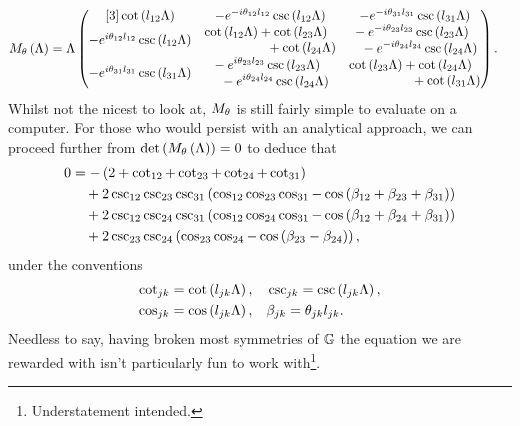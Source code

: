 \begin{align*}
	M_{\theta}\left( \Lambda \right) &= \Lambda
	\begin{pmatrix}[3]
		\cot\left( l_{12}\Lambda \right) & -
		e^{-i\theta_{12}l_{12}}\csc\left( l_{12}\Lambda \right) &
		-e^{-i\theta_{31}l_{31}}\csc\left( l_{31}\Lambda \right) \\
		-e^{i\theta_{12}l_{12}}\csc\left( l_{12}\Lambda \right) &
		\!\begin{aligned} \cot\left( l_{12}\Lambda \right) & + \cot\left( l_{23}\Lambda \right) \\ & \ \ + \cot\left( l_{24}\Lambda \right) \end{aligned} &
		\!\begin{aligned} & -e^{-i\theta_{23}l_{23}}\csc\left( l_{23}\Lambda \right) \\ & \ \ - e^{-i\theta_{24}l_{24}}\csc\left( l_{24}\Lambda \right) \end{aligned} \\
		-e^{i\theta_{31}l_{31}}\csc\left( l_{31}\Lambda \right) &
		\!\begin{aligned} & -e^{i\theta_{23}l_{23}}\csc\left( l_{23}\Lambda \right) \\ & \ \ - e^{i\theta_{24}l_{24}}\csc\left( l_{24}\Lambda \right) \end{aligned} &
		\!\begin{aligned} \cot\left( l_{23}\Lambda \right) & + \cot\left( l_{24}\Lambda \right) \\ & \ \ + \cot\left( l_{31}\Lambda \right)  \end{aligned}
	\end{pmatrix}.
\end{align*}
Whilst not the nicest to look at, $M_{\theta}$ is still fairly simple to evaluate on a computer.
For those who would persist with an analytical approach, we can proceed further from $\det\left( M_{\theta}\left( \Lambda \right) \right)=0$ to deduce that
\begin{align*}
	0 &= -\left( 2 + \cot_{12} + \cot_{23} + \cot_{24} + \cot_{31} \right) \\
	&\quad +2\csc_{12}\csc_{23}\csc_{31} \left(  \cos_{12}\cos_{23}\cos_{31} - \cos\left( \beta_{12}+\beta_{23}+\beta_{31} \right)  \right) \\
	&\quad +2\csc_{12}\csc_{24}\csc_{31} \left(  \cos_{12}\cos_{24}\cos_{31} - \cos\left( \beta_{12}+\beta_{24}+\beta_{31} \right)  \right) \\
	&\quad +2\csc_{23}\csc_{24} \left(  \cos_{23}\cos_{24} - \cos\left( \beta_{23}-\beta_{24} \right)  \right),
\end{align*}
under the conventions
\begin{align*}
	\cot_{jk} = \cot\left( l_{jk}\Lambda \right), &\quad \csc_{jk} = \csc\left( l_{jk}\Lambda \right), \\
	\cos_{jk} = \cos\left( l_{jk}\Lambda \right), &\quad \beta_{jk} = \theta_{jk}l_{jk}.
\end{align*}
Needless to say, having broken most symmetries of $\mathbb{G}$ the equation we are rewarded with isn't particularly fun to work with\footnote{Understatement intended.}. 

